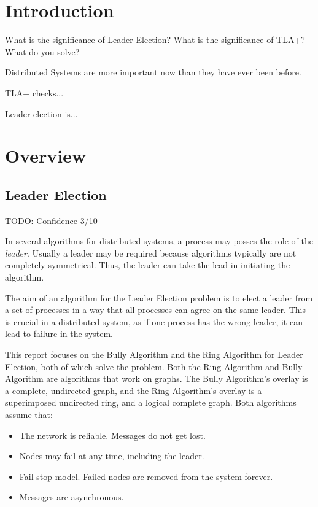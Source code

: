 \documentclass{report}
\begin{document}
\tableofcontents

\chapter{Introduction}
\begin{callout}
What is the significance of Leader Election? What is the significance of TLA+? What do you solve?
\end{callout}

Distributed Systems are more important now than they have ever been before.

TLA+ checks...

Leader election is...



\chapter{Overview}

\section{Leader Election}
\begin{callout}
TODO: Confidence 3/10
\end{callout}

In several algorithms for distributed systems, a process may posses the role of the \textit{leader}. Usually a leader may be required because algorithms typically are not completely symmetrical. Thus, the leader can take the lead in initiating the algorithm. \cite{kshemkalyani2011distributed}

The aim of an algorithm for the Leader Election problem is to elect a leader from a set of processes in a way that all processes can agree on the same leader. This is crucial in a distributed system, as if one process has the wrong leader, it can lead to failure in the system.


This report focuses on the Bully Algorithm and the Ring Algorithm for Leader Election, both of which solve the problem. Both the Ring Algorithm and Bully Algorithm are algorithms that work on graphs. The Bully Algorithm's overlay is a complete, undirected graph, and the Ring Algorithm's overlay is a superimposed undirected ring, and a logical complete graph. Both algorithms assume that:
\begin{itemize}
  \item The network is reliable. Messages do not get lost.
  \item Nodes may fail at any time, including the leader.
  \item Fail-stop model. Failed nodes are removed from the system forever.
  \item Messages are asynchronous.
\end{itemize}
\end{document}
